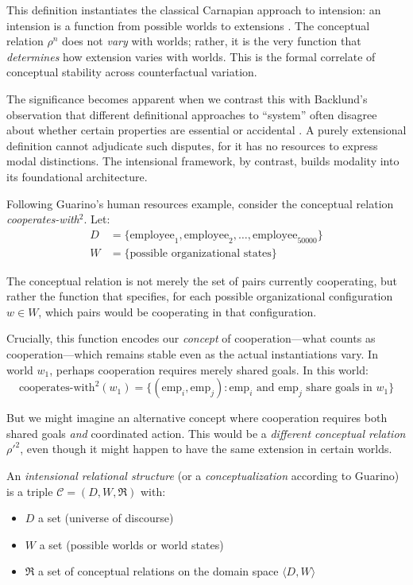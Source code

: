 This definition instantiates the classical Carnapian approach to intension: an intension is a function from possible worlds to extensions \cite{Carnap1956}. The conceptual relation $\rho^n$ does not \emph{vary} with worlds; rather, it is the very function that \emph{determines} how extension varies with worlds. This is the formal correlate of conceptual stability across counterfactual variation.

The significance becomes apparent when we contrast this with Backlund's observation that different definitional approaches to ``system'' often disagree about whether certain properties are essential or accidental \cite{Backlund2000a}. A purely extensional definition cannot adjudicate such disputes, for it has no resources to express modal distinctions. The intensional framework, by contrast, builds modality into its foundational architecture.

\begin{example}
	Following Guarino's human resources example, consider the conceptual relation \textit{cooperates-with}$^2$. Let:
	\begin{align*}
		D &= \{\text{employee}_1, \text{employee}_2, \ldots, \text{employee}_{50000}\} \\
		W &= \{\text{possible organizational states}\}
	\end{align*}
	
	The conceptual relation is not merely the set of pairs currently cooperating, but rather the function that specifies, for each possible organizational configuration $w \in W$, which pairs would be cooperating in that configuration. 
	
	Crucially, this function encodes our \emph{concept} of cooperation—what counts as cooperation—which remains stable even as the actual instantiations vary. In world $w_1$, perhaps cooperation requires merely shared goals. In this world:
	$$\text{cooperates-with}^2(w_1) = \{(\text{emp}_i, \text{emp}_j) : \text{emp}_i \text{ and } \text{emp}_j \text{ share goals in } w_1\}$$
	
	But we might imagine an alternative concept where cooperation requires both shared goals \emph{and} coordinated action. This would be a \emph{different conceptual relation} $\rho'^2$, even though it might happen to have the same extension in certain worlds.
\end{example}

\begin{definition}
	An \emph{intensional relational structure} (or a \emph{conceptualization} according to Guarino) is a triple $\mathcal{C} = (D, W, \mathfrak{R})$ with:
	\begin{itemize}
		\item $D$ a set (universe of discourse)
		\item $W$ a set (possible worlds or world states)
		\item $\mathfrak{R}$ a set of conceptual relations on the domain space $\langle D, W \rangle$
	\end{itemize}
\end{definition}

